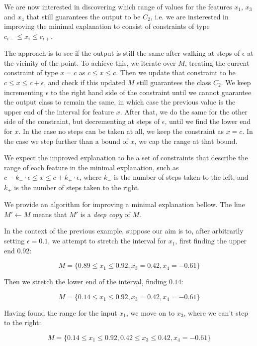 \documentclass[12pt]{article}
\begin{document}
We are now interested in discovering which range of values for the features $x_1$, $x_3$ and $x_4$ that still guarantees the output to be $C_2$, i.e. we are insterested in improving the minimal explanation to consist of constraints of type $c_{i-} \le x_i \le c_{i+}$.

The approach is to see if the output is still the same after walking at steps of $\epsilon$ at the vicinity of the point.
To achieve this, we iterate over $M$, treating the current constraint of type $x = c$ as $c \le x \le c$.
Then we update that constraint to be $c \le x \le c + \epsilon$, and check if this updated $M$ still guarantees the class $C_2$.
We keep incrementing $\epsilon$ to the right hand side of the constraint until we cannot guarantee the output class to remain the same, in which case the previous value is the upper end of the interval for feature $x$.
After that, we do the same for the other side of the constraint, but decrementing at steps of $\epsilon$, until we find the lower end for $x$.
In the case no steps can be taken at all, we keep the constraint as $x = c$.
In the case we step further than a bound of $x$, we cap the range at that bound.

We expect the improved explanation to be a set of constraints that describe the range of each feature in the minimal explanation, such as $c - k_{-} \cdot \epsilon \le x \le c + k_{+} \cdot \epsilon$, where $k_{-}$ is the number of steps taken to the left, and $k_{+}$ is the number of steps taken to the right.

We provide an algorithm for improving a minimal explanation bellow. The line $M' \gets M$ means that $M'$ is a \emph{deep copy} of $M$.

In the context of the previous example, suppose our aim is to, after arbitrarily setting $\epsilon = 0.1$, we attempt to stretch the interval for $x_1$, first finding the upper end $0.92$:

\[
M = \{0.89 \le x_1 \le 0.92,
      x_3 = 0.42,
      x_4 = -0.61\}
\]

Then we stretch the lower end of the interval, finding $0.14$:

\[
M = \{0.14 \le x_1 \le 0.92,
      x_3 = 0.42,
      x_4 = -0.61\}
\]

Having found the range for the input $x_1$, we move on to $x_3$, where we can't step to the right:

\[
M = \{0.14 \le x_1 \le 0.92,
      0.42 \le x_3 \le 0.42,
      x_4 = -0.61\}
\]
\end{document}
